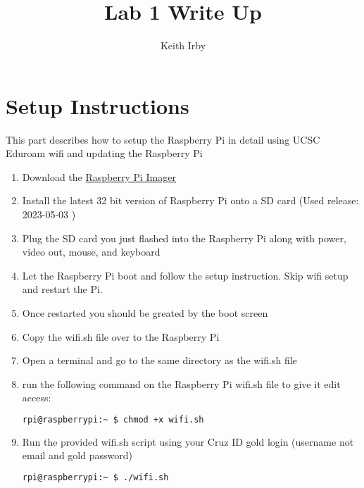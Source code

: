 \documentclass{article}
\title{Lab 1 Write Up}
\author{Keith Irby}
\begin{document}
    \maketitle %
    \section{Setup Instructions}
    This part describes how to setup the Raspberry Pi in detail using UCSC Eduroam wifi and updating the Raspberry Pi
    
    \begin{enumerate}
        \item Download the \href{https://ubuntu.com/tutorials/how-to-install-ubuntu-desktop-on-raspberry-pi-4#2-prepare-the-sd-card}{Raspberry Pi Imager}
        \item Install the latest 32 bit version of Raspberry Pi onto a SD card (Used release: 2023-05-03 )
        \item Plug the SD card you just flashed into the Raspberry Pi along with power, video out, mouse, and keyboard
        \item Let the Raspberry Pi boot and follow the setup instruction. Skip wifi setup and restart the Pi. 
        \item Once restarted you should be greated by the boot screen 
        \item Copy the wifi.sh file over to the Raspberry Pi 
        \item Open a terminal and go to the same directory as the wifi.sh file
        \item run the following command on the Raspberry Pi wifi.sh file to give it edit access: 
            \begin{lstlisting}[language=bash]
            rpi@raspberrypi:~ $ chmod +x wifi.sh
            \end{lstlisting}
        \item Run the provided wifi.sh script using your Cruz ID gold login (username not email and gold password) 
            \begin{lstlisting}[language=bash]
            rpi@raspberrypi:~ $ ./wifi.sh

\end{lstlisting}
\end{enumerate}
\end{document}
